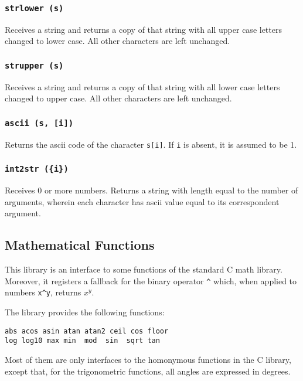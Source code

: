 \subsubsection*{{\tt strlower (s)}}
Receives a string and returns a copy of that string with all
upper case letters changed to lower case.
All other characters are left unchanged.

\subsubsection*{{\tt strupper (s)}}
Receives a string and returns a copy of that string with all
lower case letters changed to upper case.
All other characters are left unchanged.

\subsubsection*{{\tt ascii (s, [i])}}
Returns the ascii code of the character \verb's[i]'.
If \verb'i' is absent, it is assumed to be 1.

\subsubsection*{{\tt int2str (\{i\})}}
Receives 0 or more numbers.
Returns a string with length equal to the number of arguments,
wherein each character has ascii value equal
to its correspondent argument.

\subsection{Mathematical Functions} \label{mathlib}

This library is an interface to some functions of the standard C math library.
Moreover, it registers a fallback for the binary operator \verb'^' which,
when applied to numbers \verb'x^y', returns $x^y$.

The library provides the following functions:
\begin{verbatim}
abs acos asin atan atan2 ceil cos floor
log log10 max min  mod  sin  sqrt tan
\end{verbatim}
Most of them
are only interfaces to the homonymous functions in the C library,
except that, for the trigonometric functions,
all angles are expressed in degrees.

